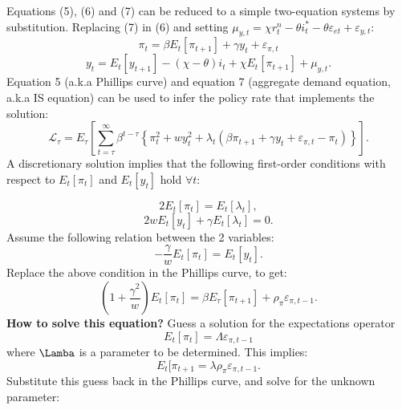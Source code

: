 \documentclass{beamer}
\begin{document}
\begin{frame} 
Equations (5), (6) and (7) can be reduced to a simple two-equation systems by
substitution. Replacing (7) in (6) and setting $\mu_{y,t} = \chi r^n_t -\theta i^*_t - \theta \varepsilon_{et}+\varepsilon_{y,t}$:
\begin{equation}
\pi_t = \beta E_t [\pi_{t+1}] + \gamma y_t + \varepsilon_{\pi,t}
\end{equation}
\begin{equation}
y_t = E_t [y_{t+1}] - (\chi - \theta) i_t + \chi E_t [\pi_{t+1}] + \mu_{y,t}.
\end{equation}
Equation 5 (a.k.a Phillips curve) and equation 7 (aggregate demand equation, a.k.a IS equation)
can be used to infer the policy rate that implements the solution:
\begin{equation}
\mathcal{L}_\tau = E_\tau \left [ \sum_{t=\tau}^\infty \beta^{t-\tau} \left \{\pi_t^2 + w y_t^2 + \lambda_t (\beta \pi_{t+1} + \gamma y_t + \varepsilon_{\pi,t} - \pi_t) \right \} \right
].
\end{equation}
A discretionary solution implies that the following first-order conditions with
respect to $E_t [\pi_t]$ and $E_t [y_t]$ hold $\forall t$:
\end{frame}

\begin{frame} 
\begin{equation}
2 E_t [\pi_t] = E_t[\lambda_t],
\end{equation}
\begin{equation}
2 w E_t [y_t] + \gamma E_t [\lambda_t] = 0.
\end{equation}
Assume the following relation between the 2 variables:
\begin{equation}
-\frac{\gamma}{w} E_t [\pi_t] = E_t [y_t].
\end{equation}
Replace the above condition in the Phillips curve, to get:
\begin{equation}
\left ( 1+\frac{\gamma^2}{w} \right ) E_t [\pi_t] = \beta E_\tau [\pi_{t+1} ] + \rho_\pi
\varepsilon_{\pi,t-1}.
\end{equation}
\textbf{How to solve this equation?} Guess a solution for the
expectations operator
\begin{equation}
E_t[\pi_t] = \Lambda \varepsilon_{\pi,t-1}
\end{equation}
where $\Lamba$ is a parameter to be determined. This implies:
\begin{equation}
E_t [\pi_{t+1} = \lambda \rho_\pi \varepsilon_{\pi,t-1}.
\end{equation}
Substitute this guess back in the Phillips curve, and solve for the unknown
parameter:
\end{frame}
\end{document}
